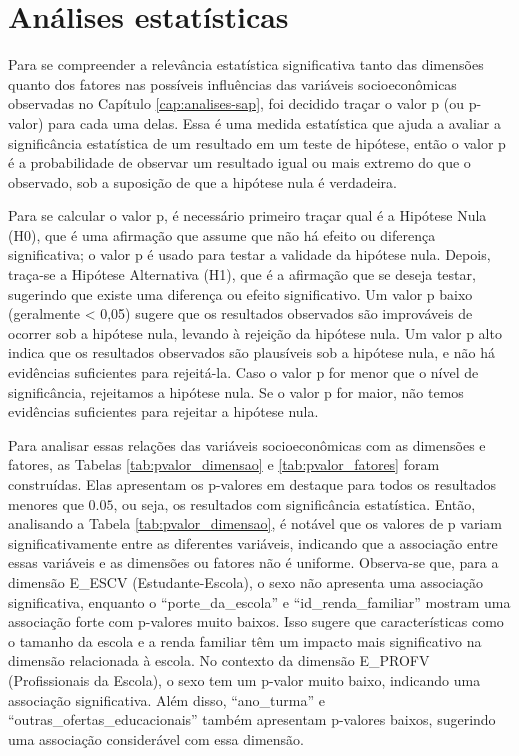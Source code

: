 \chapter{Análises estatísticas}


Para se compreender a relevância estatística significativa tanto das dimensões quanto dos fatores nas possíveis influências das variáveis socioeconômicas observadas no Capítulo \ref{cap:analises-sap}, foi decidido traçar o valor p (ou p-valor) para cada uma delas. Essa é uma medida estatística que ajuda a avaliar a significância estatística de um resultado em um teste de hipótese, então o valor p é a probabilidade de observar um resultado igual ou mais extremo do que o observado, sob a suposição de que a hipótese nula é verdadeira.

Para se calcular o valor p, é necessário primeiro traçar qual é a Hipótese Nula (H0), que é uma afirmação que assume que não há efeito ou diferença significativa; o valor p é usado para testar a validade da hipótese nula. Depois, traça-se a Hipótese Alternativa (H1), que é a afirmação que se deseja testar, sugerindo que existe uma diferença ou efeito significativo. Um valor p baixo (geralmente < 0,05) sugere que os resultados observados são improváveis de ocorrer sob a hipótese nula, levando à rejeição da hipótese nula. Um valor p alto indica que os resultados observados são plausíveis sob a hipótese nula, e não há evidências suficientes para rejeitá-la. Caso o valor p for menor que o nível de significância, rejeitamos a hipótese nula. Se o valor p for maior, não temos evidências suficientes para rejeitar a hipótese nula.

Para analisar essas relações das variáveis socioeconômicas com as dimensões e fatores, as Tabelas \ref{tab:pvalor_dimensao} e \ref{tab:pvalor_fatores} foram construídas. Elas apresentam os p-valores em destaque para todos os resultados menores que $0.05$, ou seja, os resultados com significância estatística. Então, analisando a Tabela \ref{tab:pvalor_dimensao}, é notável que os valores de p variam significativamente entre as diferentes variáveis, indicando que a associação entre essas variáveis e as dimensões ou fatores não é uniforme. Observa-se que, para a dimensão E\_ESCV (Estudante-Escola), o sexo não apresenta uma associação significativa, enquanto o ``porte\_da\_escola'' e ``id\_renda\_familiar'' mostram uma associação forte com p-valores muito baixos. Isso sugere que características como o tamanho da escola e a renda familiar têm um impacto mais significativo na dimensão relacionada à escola. No contexto da dimensão E\_PROFV (Profissionais da Escola), o sexo tem um p-valor muito baixo, indicando uma associação significativa. Além disso, ``ano\_turma'' e ``outras\_ofertas\_educacionais'' também apresentam p-valores baixos, sugerindo uma associação considerável com essa dimensão.

